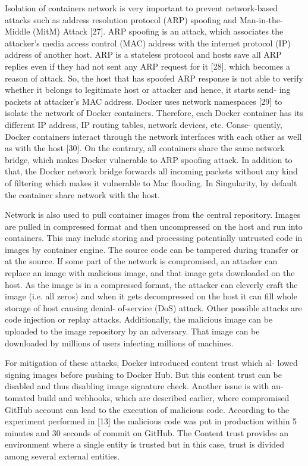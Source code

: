 \documentclass[a4paper,num-refs]{oup-contemporary}
\begin{document}
Isolation of containers network is very important to prevent network-based
attacks such as address resolution protocol (ARP) spoofing and Man-in-the-
Middle (MitM) Attack [27]. ARP spoofing is an attack, which associates the
attacker’s media access control (MAC) address with the internet protocol (IP)
address of another host. ARP is a stateless protocol and hosts save all ARP
replies even if they had not sent any ARP request for it [28], which becomes
a reason of attack. So, the host that has spoofed ARP response is not able to
verify whether it belongs to legitimate host or attacker and hence, it starts send-
ing packets at attacker’s MAC address. Docker uses network namespaces [29]
to isolate the network of Docker containers. Therefore, each Docker container
has its different IP address, IP routing tables, network devices, etc. Conse-
quently, Docker containers interact through the network interfaces with each
other as well as with the host [30]. On the contrary, all containers share the
same network bridge, which makes Docker vulnerable to ARP spoofing attack.
In addition to that, the Docker network bridge forwards all incoming packets
without any kind of filtering which makes it vulnerable to Mac flooding.
In Singularity, by default the container share network
with the host. 

Network is also used to pull container images from the central repository.
Images are pulled in compressed format and then uncompressed on the host and
run into containers. This may include storing and processing potentially
untrusted code in images by container engine. The source code can
be tampered during transfer or at the source. If some part of the network
is compromised, an attacker can replace an image with malicious image, and
that image gets downloaded on the host. As the image is in a compressed
format, the attacker can cleverly craft the image (i.e. all zeros) and when it
gets decompressed on the host it can fill whole storage of host causing denial-
of-service (DoS) attack. Other possible attacks are code injection or replay
attacks. Additionally, the malicious image can be uploaded to the image
repository by an adversary. That image can be downloaded by millions of users infecting
millions of machines.

For mitigation of these attacks, Docker introduced content trust which al-
lowed signing images before pushing to Docker Hub. But this content trust can
be disabled and thus disabling image signature check. Another issue is with au-
tomated build and webhooks, which are described earlier, where compromised
GitHub account can lead to the execution of malicious code. According to the
experiment performed in [13] the malicious code was put in production within
5 minutes and 30 seconds of commit on GitHub. The Content trust provides
an environment where a single entity is trusted but in this case, trust is divided
among several external entities.
\end{document}
